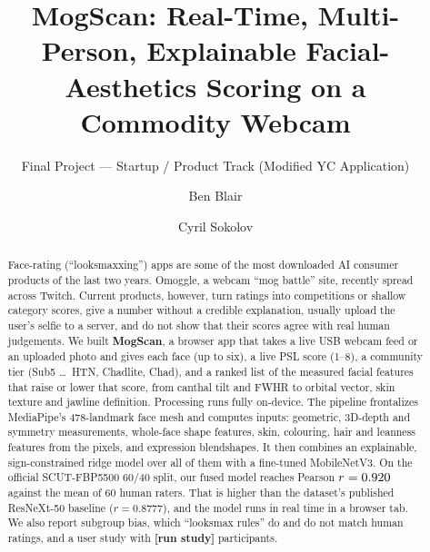 \documentclass[sigconf,nonacm]{acmart}
\newcommand{\pending}[1]{\textcolor{todo}{\textbf{[#1]}}}
\newcommand{\studyval}[1]{\ifdefined\studyPending\pending{run study}\else#1\fi}
\begin{document}
\title{MogScan: Real-Time, Multi-Person, Explainable Facial-Aesthetics Scoring on a Commodity Webcam}
\subtitle{Final Project --- Startup / Product Track (Modified YC Application)}

\author{Ben Blair}
\author{Cyril Sokolov}
\renewcommand{\shortauthors}{Blair and Sokolov}

\begin{abstract}
Face-rating (``looksmaxxing'') apps are some of the most downloaded AI consumer products of the last two
years. Omoggle, a webcam ``mog battle'' site, recently spread across Twitch. Current products, however,
turn ratings into competitions or shallow category scores, give a number without a credible explanation, usually upload the user's selfie
to a server, and do not show that their scores agree with real human judgements. We built
\textbf{MogScan}, a browser app that takes a live USB webcam feed or an uploaded photo and gives each face (up to
six), a live PSL score (1--8), a community tier (Sub5 \dots\ HTN, Chadlite, Chad), and a ranked list of
the measured facial features that raise or lower that score, from canthal tilt and FWHR to orbital vector,
skin texture and jawline definition. Processing runs fully on-device. The pipeline frontalizes MediaPipe's
478-landmark face mesh and computes \nFeatures{} inputs: \nGeometry{} geometric, 3D-depth and symmetry
measurements, \nShape{} whole-face shape features, \nPixel{} skin, colouring, hair and leanness features from
the pixels, and \nExpression{} expression blendshapes. It then combines an explainable, sign-constrained
ridge model over all of them with a fine-tuned MobileNetV3. On the official SCUT-FBP5500 60/40 split, our fused model reaches Pearson $r=0.920$ against
the mean of 60 human raters. That is higher than the dataset's published ResNeXt-50 baseline ($r=0.8777$), and the model
runs in real time in a browser tab. We also report subgroup bias, which ``looksmax rules'' do and do not
match human ratings, and a user study with \studyval{\studyN} participants.
\end{abstract}

\maketitle
\end{document}
